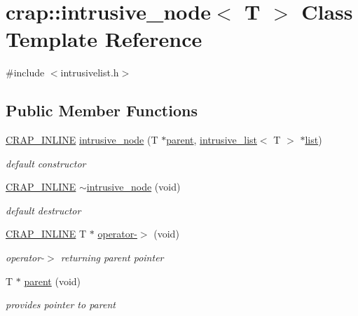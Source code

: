 \hypertarget{classcrap_1_1intrusive__node}{}\section{crap\+:\+:intrusive\+\_\+node$<$ T $>$ Class Template Reference}
\label{classcrap_1_1intrusive__node}


{\ttfamily \#include $<$intrusivelist.\+h$>$}

\subsection*{Public Member Functions}
\begin{DoxyCompactItemize}
\item 
\hyperlink{config__x86_8h_a5a40526b8d842e7ff731509998bb0f1c}{C\+R\+A\+P\+\_\+\+I\+N\+L\+I\+N\+E} \hyperlink{classcrap_1_1intrusive__node_aa8313184bdab330161351d6f29fb689c}{intrusive\+\_\+node} (T $\ast$\hyperlink{classcrap_1_1intrusive__node_a64fa7fffc54fe23e13c2b42f610ac52c}{parent}, \hyperlink{classcrap_1_1intrusive__list}{intrusive\+\_\+list}$<$ T $>$ $\ast$\hyperlink{classcrap_1_1list}{list})
\begin{DoxyCompactList}\small\item\em default constructor \end{DoxyCompactList}\item 
\hyperlink{config__x86_8h_a5a40526b8d842e7ff731509998bb0f1c}{C\+R\+A\+P\+\_\+\+I\+N\+L\+I\+N\+E} \hyperlink{classcrap_1_1intrusive__node_ac158a93b90ccb4ca68bc8b2f9170dcfa}{$\sim$intrusive\+\_\+node} (void)
\begin{DoxyCompactList}\small\item\em default destructor \end{DoxyCompactList}\item 
\hyperlink{config__x86_8h_a5a40526b8d842e7ff731509998bb0f1c}{C\+R\+A\+P\+\_\+\+I\+N\+L\+I\+N\+E} T $\ast$ \hyperlink{classcrap_1_1intrusive__node_abde18cd1dac827f8480044ef588cdcbb}{operator-\/$>$} (void)
\begin{DoxyCompactList}\small\item\em operator-\/$>$ returning parent pointer \end{DoxyCompactList}\item 
T $\ast$ \hyperlink{classcrap_1_1intrusive__node_a64fa7fffc54fe23e13c2b42f610ac52c}{parent} (void)
\begin{DoxyCompactList}\small\item\em provides pointer to parent \end{DoxyCompactList}\item 

\end{DoxyCompactItemize}
